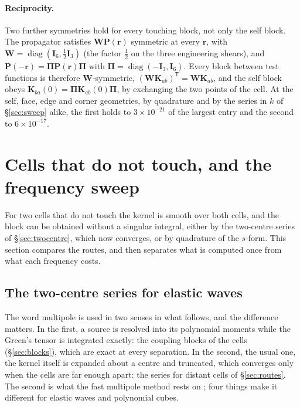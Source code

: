 \documentclass[11pt,a4paper]{article}
\newcommand{\bK}{\mathbf{K}}
\newcommand{\bP}{\mathbf{P}}
\begin{document}
\paragraph{Reciprocity.} Two further symmetries hold for every touching block, not only the self block.
The propagator satisfies $\mathbf{W}\bP(\mathbf{r})$ symmetric at every $\mathbf{r}$, with
$\mathbf{W}=\operatorname{diag}(\mathbf{I}_6,\tfrac12\mathbf{I}_3)$ (the factor $\tfrac12$ on the three
engineering shears), and $\bP(-\mathbf{r})=\boldsymbol\Pi\bP(\mathbf{r})\boldsymbol\Pi$ with
$\boldsymbol\Pi=\operatorname{diag}(-\mathbf{I}_3,\mathbf{I}_6)$. Every block between test functions is
therefore $\mathbf{W}$-symmetric, $(\mathbf{W}\bK_{ab})^{\mathsf T}=\mathbf{W}\bK_{ab}$, and the self
block obeys $\bK_{ba}(0)=\boldsymbol\Pi\bK_{ab}(0)\boldsymbol\Pi$, by exchanging the two points of the
cell. At the self, face, edge and corner geometries, by quadrature and by the series in $k$ of
\S\ref{sec:sweep} alike, the first holds to $3\times10^{-21}$ of the largest entry and the second to
$6\times10^{-17}$.

\section{Cells that do not touch, and the frequency sweep}\label{sec:distant}

For two cells that do not touch the kernel is smooth over both cells, and the block can be obtained
without a singular integral, either by the two-centre series of \S\ref{sec:twocentre}, which now converges,
or by quadrature of the $s$-form. This section compares the routes, and then separates what is computed
once from what each frequency costs.

\subsection{The two-centre series for elastic waves}\label{sec:multipoles}

The word multipole is used in two senses in what follows, and the difference matters. In the first, a
source is resolved into its polynomial moments while the Green's tensor is integrated exactly: the
coupling blocks of the cells (\S\ref{sec:blocks}), which are exact at every separation. In the second, the usual one, the kernel itself is
expanded about a centre and truncated, which converges only when the cells are far enough apart: the
series for distant cells of \S\ref{sec:routes}. The second is what the fast multipole method rests on
\citep{CarrierGreengardRokhlin1988}; four things make it different for elastic waves and polynomial cubes.
\end{document}
